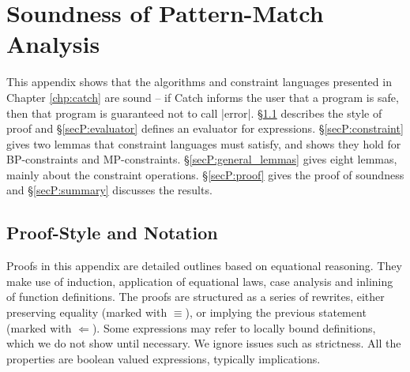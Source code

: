 \begin{comment}
instance Eq Value
instance Eq Expr

alt :: Alt -> Prop (Sat a)
pre' :: String -> [Expr] -> Prop (Sat Expr)
sub :: ([VarName],[Expr])
\end{code}

\begin{code}
-- for BP
anys :: String -> Constraint
instance Eq Constraint
\end{code}

\h{.mp}\begin{code}
-- for MP
type Constraint = [Val]
data Val = [Pattern] :* [Pattern] | Any deriving Eq
data Pattern = Pattern CtorName [Val] deriving Eq
complete :: CtorName -> Pattern
nonRecs :: CtorName -> [Int]
merge :: [Pattern] -> [Pattern] -> [Pattern]
non :: [Int]
rec :: [Int]
\end{code}
\end{comment}


\chapter{Soundness of Pattern-Match Analysis}
\label{chp:proof}

This appendix shows that the algorithms and constraint languages presented in Chapter \ref{chp:catch} are sound -- if Catch informs the user that a program is safe, then that program is guaranteed not to call |error|. \S\ref{secP:style} describes the style of proof and \S\ref{secP:evaluator} defines an evaluator for expressions. \S\ref{secP:constraint} gives two lemmas that constraint languages must satisfy, and shows they hold for BP-constraints and MP-constraints. \S\ref{secP:general_lemmas} gives eight lemmas, mainly about the constraint operations. \S\ref{secP:proof} gives the proof of soundness and \S\ref{secP:summary} discusses the results.


\section{Proof-Style and Notation}
\label{secP:style}

Proofs in this appendix are detailed outlines based on equational reasoning. They make use of induction, application of equational laws, case analysis and inlining of function definitions. The proofs are structured as a series of rewrites, either preserving equality (marked with $\equiv$), or implying the previous statement (marked with $\Leftarrow$). Some expressions may refer to locally bound definitions, which we do not show until necessary. We ignore issues such as strictness. All the properties are boolean valued expressions, typically implications.

